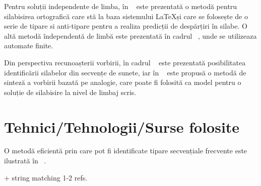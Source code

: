 Pentru soluții independente de limba, în ~\cite{bib:liang1983word} este prezentată o metodă pentru silabisirea ortografică care stă la baza sistemului \LaTeX și care se folosește de o serie de tipare si anti-tipare pentru a realiza predicții de despărțiri în silabe. O altă metodă îndependentă de limbă este prezentată în cadrul ~\cite{bib:kiraz1998multilingua}, unde se utilizeaza automate finite. 

Din perspectiva recunoașterii vorbirii, în cadrul ~\cite{bib:hunt1980experiments} este prezentată posibilitatea identificării silabelor din secvențe de sunete, iar în ~\cite{bib:damper1997pronunciation} este propusă o metodă de sinteză a vorbirii bazată pe analogie, care poate fi folosită ca model pentru o soluție de silabisire la nivel de limbaj scris. 

\section{Tehnici/Tehnologii/Surse folosite}

O metodă eficientă prin care pot fi identificate tipare secvențiale frecvente este ilustrată în ~\cite{bib:wang2004bide}. 

+ string matching 1-2 refs.